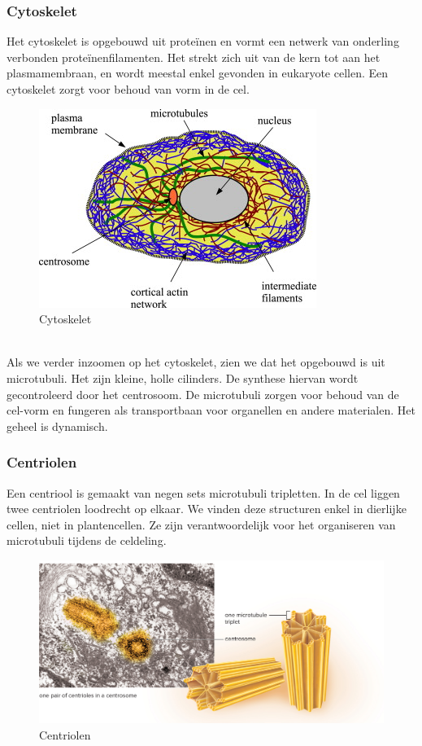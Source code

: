 \documentclass[a4paper,kul]{kulakarticle} %
\begin{document}
\subsubsection{Cytoskelet}
Het cytoskelet is opgebouwd uit proteïnen en vormt een netwerk van onderling verbonden proteïnenfilamenten. Het strekt zich uit van de kern tot aan het plasmamembraan, en wordt meestal enkel gevonden in eukaryote cellen. Een cytoskelet zorgt voor behoud van vorm in de cel.
\begin{figure}[h]
	\centering
	\includegraphics[width=0.5\linewidth]{Cytoskelet}
	\caption[Cytoskelet]{Cytoskelet}
	\label{fig:cytoskelet}
\end{figure}\\
Als we verder inzoomen op het cytoskelet, zien we dat het opgebouwd is uit microtubuli. Het zijn kleine, holle cilinders. De synthese hiervan wordt gecontroleerd door het centrosoom. De microtubuli zorgen voor behoud van de cel-vorm en fungeren als transportbaan voor organellen en andere materialen. Het geheel is dynamisch.

\subsubsection{Centriolen}
Een centriool is gemaakt van negen sets microtubuli tripletten. In de cel liggen twee centriolen loodrecht op elkaar. We vinden deze structuren enkel in dierlijke cellen, niet in plantencellen. Ze zijn verantwoordelijk voor het organiseren van microtubuli tijdens de celdeling. 
\begin{figure}[h]
	\centering
	\includegraphics[width=0.5\linewidth]{Centriolen}
	\caption[Centriolen]{Centriolen}
	\label{fig:centriolen}
\end{figure}
\end{document}
